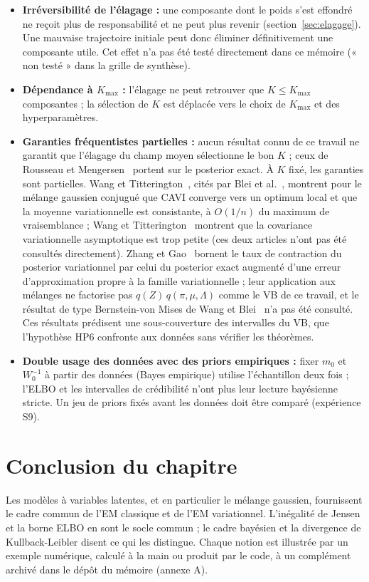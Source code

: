 \begin{itemize}
\item \textbf{Irréversibilité de l'élagage : }une composante dont le poids s'est effondré ne reçoit plus de responsabilité et ne peut plus revenir (section~\ref{sec:elagage}). Une mauvaise trajectoire initiale peut donc éliminer définitivement une composante utile. Cet effet n'a pas été testé directement dans ce mémoire (« non testé » dans la grille de synthèse).
\item \textbf{Dépendance à $K_{\max}$ : }l'élagage ne peut retrouver que $K \leq K_{\max}$ composantes ; la sélection de $K$ est déplacée vers le choix de $K_{\max}$ et des hyperparamètres.
\item \textbf{Garanties fréquentistes partielles : }aucun résultat connu de ce travail ne garantit que l'élagage du champ moyen sélectionne le bon $K$ ; ceux de Rousseau et Mengersen~\cite{rousseau2011} portent sur le posterior exact. À $K$ fixé, les garanties sont partielles. Wang et Titterington~\cite{wang2006}, cités par Blei et al.~\cite[section~5.2]{blei2017}, montrent pour le mélange gaussien conjugué que CAVI converge vers un optimum local et que la moyenne variationnelle est consistante, à $O(1/n)$ du maximum de vraisemblance ; Wang et Titterington~\cite{wang2005} montrent que la covariance variationnelle asymptotique est trop petite (ces deux articles n'ont pas été consultés directement). Zhang et Gao~\cite{zhang2020} bornent le taux de contraction du posterior variationnel par celui du posterior exact augmenté d'une erreur d'approximation propre à la famille variationnelle ; leur application aux mélanges ne factorise pas $q(Z)\,q(\pi, \mu, \Lambda)$ comme le VB de ce travail, et le résultat de type Bernstein-von Mises de Wang et Blei~\cite{wang2019} n'a pas été consulté. Ces résultats prédisent une sous-couverture des intervalles du VB, que l'hypothèse HP6 confronte aux données sans vérifier les théorèmes.
\item \textbf{Double usage des données avec des priors empiriques : }fixer $m_0$ et $W_0^{-1}$ à partir des données (Bayes empirique) utilise l'échantillon deux fois ; l'ELBO et les intervalles de crédibilité n'ont plus leur lecture bayésienne stricte. Un jeu de priors fixés avant les données doit être comparé (expérience S9).
\end{itemize}
\section{Conclusion du chapitre}\label{sec:conclusion_du_chapitre_1}
Les modèles à variables latentes, et en particulier le mélange gaussien, fournissent le cadre commun de l'EM classique et de l'EM variationnel. L'inégalité de Jensen et la borne ELBO en sont le socle commun ; le cadre bayésien et la divergence de Kullback-Leibler disent ce qui les distingue. Chaque notion est illustrée par un exemple numérique, calculé à la main ou produit par le code, à un complément archivé dans le dépôt du mémoire (annexe A).

